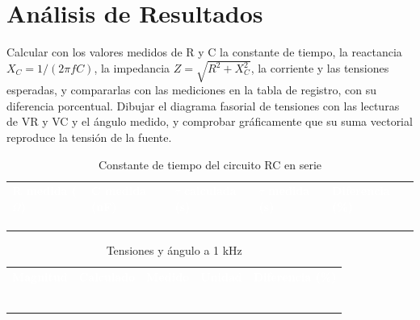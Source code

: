 \documentclass[12pt]{article}
\begin{document}
\section{Análisis de Resultados}\label{sec:analisis}
Calcular con los valores medidos de R y C la constante de tiempo, la reactancia $X_C = 1/(2\pi f C)$, la impedancia $Z = \sqrt{R^2 + X_C^2}$, la corriente y las tensiones esperadas, y compararlas con las mediciones en la tabla de registro, con su diferencia porcentual.
\lineablanco
Dibujar el diagrama fasorial de tensiones con las lecturas de VR y VC y el ángulo medido, y comprobar gráficamente que su suma vectorial reproduce la tensión de la fuente.
\begin{table}[H]
  \centering
  \caption{Constante de tiempo del circuito RC en serie}
  \label{tab:registro-1}
  \begin{tabularx}{\linewidth}{>{\raggedright\arraybackslash}X>{\raggedright\arraybackslash}X>{\raggedright\arraybackslash}X>{\raggedright\arraybackslash}X>{\raggedright\arraybackslash}X}
    \rowcolor{iubnavy} \textcolor{white}{\textbf{R medida (\ensuremath{\Omega})}} & \textcolor{white}{\textbf{C medida (nF)}} & \textcolor{white}{\textbf{\ensuremath{\tau} calculada (\textmu{}s)}} & \textcolor{white}{\textbf{\ensuremath{\tau} medida (\textmu{}s)}} & \textcolor{white}{\textbf{Diferencia (\%)}} \\
    \rule{0pt}{0.8cm} & & & & \\
    \rowcolor{iubfondogris} \rule{0pt}{0.8cm} & & & & \\
    \rule{0pt}{0.8cm} & & & & \\
    \bottomrule
  \end{tabularx}
\end{table}
\begin{table}[H]
  \centering
  \caption{Tensiones y ángulo a 1 kHz}
  \label{tab:registro-2}
  \begin{tabularx}{\linewidth}{>{\raggedright\arraybackslash}X>{\raggedright\arraybackslash}X>{\raggedright\arraybackslash}X>{\raggedright\arraybackslash}X>{\raggedright\arraybackslash}X}
    \rowcolor{iubnavy} \textcolor{white}{\textbf{Magnitud}} & \textcolor{white}{\textbf{Calculado}} & \textcolor{white}{\textbf{Medido}} & \textcolor{white}{\textbf{Unidad}} & \textcolor{white}{\textbf{Diferencia (\%)}} \\
    \rule{0pt}{0.8cm} & & & & \\
    \rowcolor{iubfondogris} \rule{0pt}{0.8cm} & & & & \\
    \rule{0pt}{0.8cm} & & & & \\
    \rowcolor{iubfondogris} \rule{0pt}{0.8cm} & & & & \\
    \rule{0pt}{0.8cm} & & & & \\
    \rowcolor{iubfondogris} \rule{0pt}{0.8cm} & & & & \\
    \bottomrule
  \end{tabularx}
\end{table}
\end{document}
